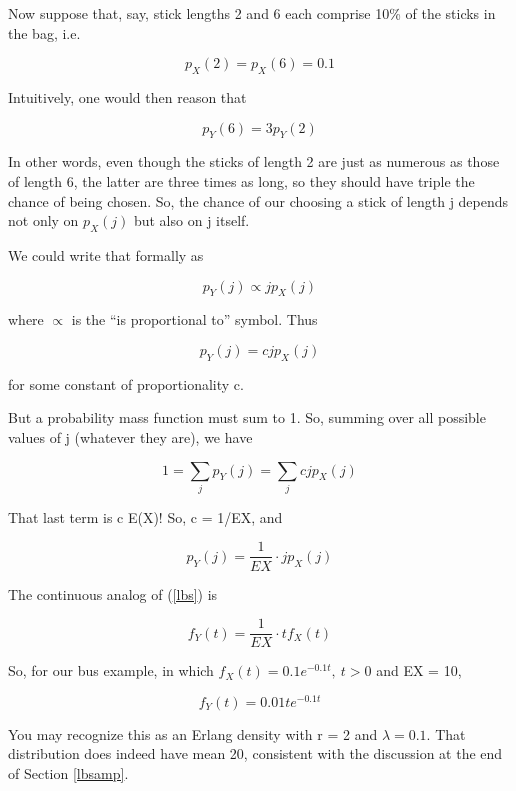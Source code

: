 Now suppose that, say, stick lengths 2 and 6 each comprise 10\% of the
sticks in the bag, i.e.

\begin{equation}
p_X(2) = p_X(6) = 0.1
\end{equation}

Intuitively, one would then reason that 

\begin{equation}
p_Y(6) = 3 p_Y(2) 
\end{equation}

In other words, even though the sticks of length 2 are just as numerous
as those of length 6, the latter are three times as long, so they should
have triple the chance of being chosen.  So, the chance of our choosing
a stick of length j depends not only on $p_X(j)$ but also on j itself.

We could write that formally as

\begin{equation}
p_Y(j) \propto j p_X(j)
\end{equation}

where $\propto$ is the ``is proportional to'' symbol.  Thus

\begin{equation}
p_Y(j) = c j p_X(j)
\end{equation}

for some constant of proportionality c.

But a probability mass function must sum to 1.  So, summing over all
possible values of j (whatever they are), we have

\begin{equation}
1 = \sum_{j} p_Y(j) = \sum_{j} c j p_X(j) 
\end{equation}

That last term is c E(X)!  So, c = 1/EX, and

\begin{equation}
\label{lbs}
p_Y(j) = \frac{1}{EX} \cdot j p_X(j)
\end{equation}


The continuous analog of (\ref{lbs}) is

\begin{equation}
\label{lbscontin}
f_Y(t) = \frac{1}{EX} \cdot t f_X(t)
\end{equation}

So, for our bus example, in which $f_X(t) = 0.1e^{-0.1 t}, ~ t > 0$ and
EX = 10,

\begin{equation}
f_Y(t) = 0.01 t e^{-0.1 t}
\end{equation}

You may recognize this as an Erlang density with r = 2 and $\lambda =
0.1$.  That distribution does indeed have mean 20, consistent with the
discussion at the end of Section \ref{lbsamp}.
